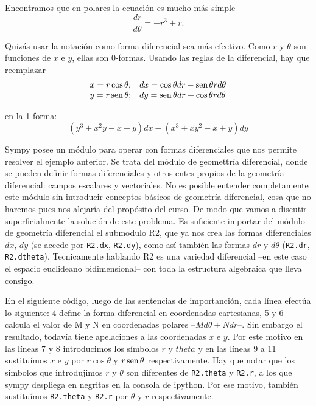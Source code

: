 
 Encontramos que en polares la ecuación es mucho más simple
\[\frac{dr}{d\theta}=-r^3+r.\]

 Quizás  usar la notación como  forma diferencial sea más efectivo. Como $r$ y $\theta$ son funciones de $x$ e $y$, ellas son 0-formas. Usando las reglas de la diferencial, hay que reemplazar
\[
\begin{array}{ll}
x=r\cos\theta; &dx=\cos\theta dr-\operatorname{sen}\theta r d\theta\\
 y= r\operatorname{sen}\theta; & dy=\operatorname{sen}\theta dr+\cos\theta r d\theta\\
\end{array}
\]

 en la 1-forma:
\[(y^3+x^2y-x-y)dx-(x^3+xy^2-x+y)dy\]

Sympy posee un módulo para operar con formas diferenciales que nos permite resolver el ejemplo anterior. Se trata del módulo de geomettría diferencial, donde se pueden definir formas diferenciales 
y otros entes propios de la geometría diferencial: campos escalares  y 
vectoriales. No es posible entender completamente este módulo sin introducir conceptos básicos de geometría diferencial, cosa que no haremos pues nos alejaría del propósito del curso. De modo que vamos a discutir superficialmente la solución de este problema.  Es suficiente importar del módulo de geometría diferencial el submodulo R2, que ya nos
crea las formas diferenciales $dx$, $dy$  (se accede por \texttt{R2.dx}, \texttt{R2.dy}), como 
así también las formas $dr$ y $d\theta$ (\texttt{R2.dr}, \texttt{R2.dtheta}). Tecnicamente hablando R2 es una variedad diferencial --en este caso el espacio euclideano bidimensional-- con toda la estructura algebraica que lleva consigo.  

En el siguiente código, luego de las sentencias de importanción, cada línea efectúa lo siguiente: 4-define la forma diferencial en coordenadas cartesianas, 5 y 6-calcula el valor de M y N en coordenadas polares --$Md\theta+N dr$--. Sin embargo el resultado, todavía tiene apelaciones a las coordenadas $x$ e $y$. Por este motivo en las líneas 7 y 8 introducimos los símbolos $r$ y $theta$ y en las líneas 9 a 11 sustituímos $x$ e $y$ por $r\cos\theta$ y $r\operatorname{sen}\theta$ respectivamente. Hay que notar que los simbolos que introdujimos $r$ y $\theta$ son diferentes de \texttt{R2.theta} y \texttt{R2.r}, a los que sympy despliega en negritas en la consola de ipython.  Por ese motivo, también sustituímos   \texttt{R2.theta} y \texttt{R2.r} por $\theta$ y $r$ respectivamente.

